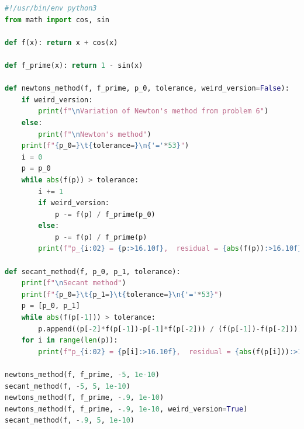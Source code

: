 \documentclass{article}
\begin{document}
\bigskip
\begin{lstlisting}[language=Python]
#!/usr/bin/env python3
from math import cos, sin

def f(x): return x + cos(x)

def f_prime(x): return 1 - sin(x)

def newtons_method(f, f_prime, p_0, tolerance, weird_version=False):
    if weird_version:
        print(f"\nVariation of Newton's method from problem 6")
    else:
        print(f"\nNewton's method")
    print(f"{p_0=}\t{tolerance=}\n{'='*53}")
    i = 0
    p = p_0
    while abs(f(p)) > tolerance:
        i += 1
        if weird_version:
            p -= f(p) / f_prime(p_0)
        else:
            p -= f(p) / f_prime(p)
        print(f"p_{i:02} = {p:>16.10f},  residual = {abs(f(p)):>16.10f}")

def secant_method(f, p_0, p_1, tolerance):
    print(f"\nSecant method")
    print(f"{p_0=}\t{p_1=}\t{tolerance=}\n{'='*53}")
    p = [p_0, p_1]
    while abs(f(p[-1])) > tolerance:
        p.append((p[-2]*f(p[-1])-p[-1]*f(p[-2])) / (f(p[-1])-f(p[-2])))
    for i in range(len(p)):
        print(f"p_{i:02} = {p[i]:>16.10f},  residual = {abs(f(p[i])):>16.10f}")

newtons_method(f, f_prime, -5, 1e-10)
secant_method(f, -5, 5, 1e-10)
newtons_method(f, f_prime, -.9, 1e-10)
newtons_method(f, f_prime, -.9, 1e-10, weird_version=True)
secant_method(f, -.9, 5, 1e-10)
\end{lstlisting}
\bigskip
\end{document}
